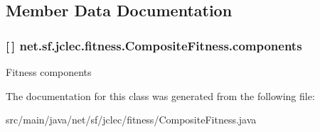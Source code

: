 \subsection{Member Data Documentation}
\hypertarget{classnet_1_1sf_1_1jclec_1_1fitness_1_1_composite_fitness_a07576591ce53292c41a9283d0baed349}{
\subsubsection[{components}]{ \mbox{[}$\,$\mbox{]} net.\-sf.\-jclec.\-fitness.\-Composite\-Fitness.\-components\hspace{0.3cm}{\ttfamily [protected]}}}\label{classnet_1_1sf_1_1jclec_1_1fitness_1_1_composite_fitness_a07576591ce53292c41a9283d0baed349}
Fitness components 

The documentation for this class was generated from the following file\-:\begin{DoxyCompactItemize}
\item 
src/main/java/net/sf/jclec/fitness/Composite\-Fitness.\-java\end{DoxyCompactItemize}
